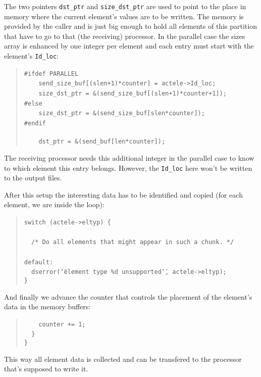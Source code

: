 The two pointers \texttt{dst{\_}ptr} and \texttt{size{\_}dst{\_}ptr}
are used to point to the place in memory where the current element's
values are to be written. The memory is provided by the caller and
is just big enough to hold all elements of this partition that have
to go to that (the receiving) processor. In the parallel case the
sizes array is enhanced by one integer per element and each entry
must start with the element's \texttt{Id{\_}loc}: 

\begin{quote}
\texttt{{\#}ifdef~PARALLEL~}~\\
 \texttt{~~~~send{\_}size{\_}buf{[}(slen+1){*}counter]~=~actele->Id{\_}loc;~}~\\
 \texttt{~~~~size{\_}dst{\_}ptr~=~{\&}(send{\_}size{\_}buf{[}(slen+1){*}counter+1]);~}~\\
 \texttt{{\#}else~}~\\
 \texttt{~~~~size{\_}dst{\_}ptr~=~{\&}(send{\_}size{\_}buf{[}slen{*}counter]);~}~\\
 \texttt{{\#}endif~}~\\
 \texttt{~}~\\
 \texttt{~~~~dst{\_}ptr~=~{\&}(send{\_}buf{[}len{*}counter]); }
\end{quote}
The receiving processor needs this additional integer in the parallel
case to know to which element this entry belongs. However, the \texttt{Id{\_}loc}
here won't be written to the output files.

After this setup the interesting data has to be identified and copied
(for each element, we are inside the loop): 

\begin{quote}
\texttt{switch~(actele->eltyp)~{\{}~}~\\
 \texttt{~}~\\
 \texttt{~~/{*}~Do~all~elements~that~might~appear~in~such~a~chunk.~{*}/~}~\\
 \texttt{~}~\\
 \texttt{default:~}~\\
 \texttt{~~dserror(\char`\"{}element~type~{\%}d~unsupported\char`\"{},~actele->eltyp);~}~\\
 \texttt{{\}} }
\end{quote}
And finally we advance the counter that controls the placement of
the element's data in the memory buffers: 

\begin{quote}
\texttt{~~~~counter~+=~1;~}~\\
 \texttt{~~{\}}~}~\\
 \texttt{{\}} }
\end{quote}
This way all element data is collected and can be transfered to the
processor that's supposed to write it.

